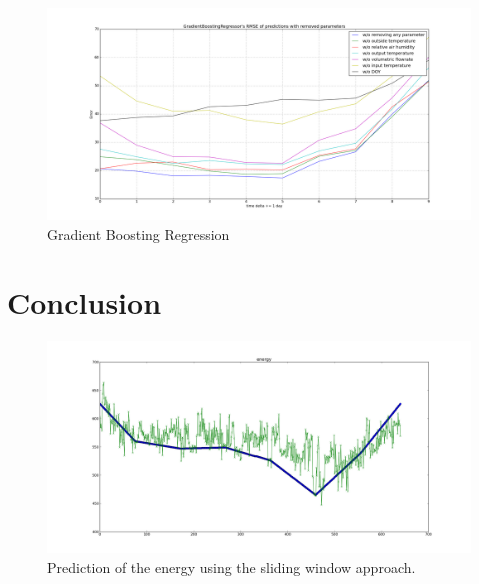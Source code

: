 \documentclass{scrartcl}
\begin{document}
\begin{figure}[H]
  \center
  \includegraphics[width=1\linewidth]{img/GradientBoostingRegressor_day_error_without_some_params.png}
  \caption{Gradient Boosting Regression}
  \label{fig:GradientBoostingRegressor_day_error_without_some_params}
\end{figure}

\section{Conclusion}
\label{sec:conclusion}
\begin{figure}[H]
  \includegraphics[width=0.6\linewidth]{img/predict-energy-53--0p520.png}
  \caption{Prediction of the energy using the sliding window approach.}
  \label{fig:Prediction}
\end{figure}






\end{document}
